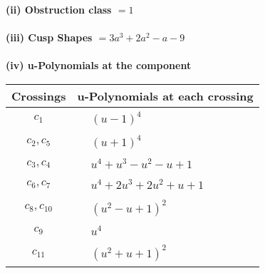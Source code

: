 \documentclass[1p]{elsarticle_modified}
\theoremstyle{definition}
\begin{document}
\flushleft \textbf{(ii) Obstruction class $= 1$}\\~\\
\flushleft \textbf{(iii) Cusp Shapes $= 3 a^3+2 a^2- a-9$}\\~\\
\newpage\renewcommand{\arraystretch}{1}
\flushleft \textbf{(iv) u-Polynomials at the component}\newline \\
\begin{tabular}{m{50pt}|m{274pt}}
Crossings & \hspace{64pt}u-Polynomials at each crossing \\
\hline $$\begin{aligned}c_{1}\end{aligned}$$&$\begin{aligned}
&(u-1)^4
\end{aligned}$\\
\hline $$\begin{aligned}c_{2},c_{5}\end{aligned}$$&$\begin{aligned}
&(u+1)^4
\end{aligned}$\\
\hline $$\begin{aligned}c_{3},c_{4}\end{aligned}$$&$\begin{aligned}
&u^4+u^3- u^2- u+1
\end{aligned}$\\
\hline $$\begin{aligned}c_{6},c_{7}\end{aligned}$$&$\begin{aligned}
&u^4+2 u^3+2 u^2+u+1
\end{aligned}$\\
\hline $$\begin{aligned}c_{8},c_{10}\end{aligned}$$&$\begin{aligned}
&(u^2- u+1)^2
\end{aligned}$\\
\hline $$\begin{aligned}c_{9}\end{aligned}$$&$\begin{aligned}
&u^4
\end{aligned}$\\
\hline $$\begin{aligned}c_{11}\end{aligned}$$&$\begin{aligned}
&(u^2+u+1)^2
\end{aligned}$\\
\hline
\end{tabular}\\~\\
\end{document}
